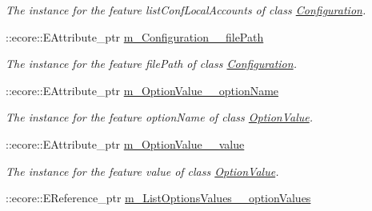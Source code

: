 \begin{DoxyCompactItemize}
\begin{DoxyCompactList}\small\item\em The instance for the feature listConfLocalAccounts of class \hyperlink{classUMS__Data_1_1Configuration}{Configuration}. \item\end{DoxyCompactList}\item 
\hypertarget{classUMS__Data_1_1UMS__DataPackage_a920d5cf0cef56c74876fea811f94db49}{
::ecore::EAttribute\_\-ptr \hyperlink{classUMS__Data_1_1UMS__DataPackage_a920d5cf0cef56c74876fea811f94db49}{m\_\-Configuration\_\-\_\-filePath}}
\label{classUMS__Data_1_1UMS__DataPackage_a920d5cf0cef56c74876fea811f94db49}

\begin{DoxyCompactList}\small\item\em The instance for the feature filePath of class \hyperlink{classUMS__Data_1_1Configuration}{Configuration}. \item\end{DoxyCompactList}\item 
\hypertarget{classUMS__Data_1_1UMS__DataPackage_a3a4c33668b970f193420bc685a4491d2}{
::ecore::EAttribute\_\-ptr \hyperlink{classUMS__Data_1_1UMS__DataPackage_a3a4c33668b970f193420bc685a4491d2}{m\_\-OptionValue\_\-\_\-optionName}}
\label{classUMS__Data_1_1UMS__DataPackage_a3a4c33668b970f193420bc685a4491d2}

\begin{DoxyCompactList}\small\item\em The instance for the feature optionName of class \hyperlink{classUMS__Data_1_1OptionValue}{OptionValue}. \item\end{DoxyCompactList}\item 
\hypertarget{classUMS__Data_1_1UMS__DataPackage_adf371e12d98bc5bd707cf7c759a95f87}{
::ecore::EAttribute\_\-ptr \hyperlink{classUMS__Data_1_1UMS__DataPackage_adf371e12d98bc5bd707cf7c759a95f87}{m\_\-OptionValue\_\-\_\-value}}
\label{classUMS__Data_1_1UMS__DataPackage_adf371e12d98bc5bd707cf7c759a95f87}

\begin{DoxyCompactList}\small\item\em The instance for the feature value of class \hyperlink{classUMS__Data_1_1OptionValue}{OptionValue}. \item\end{DoxyCompactList}\item 
\hypertarget{classUMS__Data_1_1UMS__DataPackage_adf21d8c0c0bd93b233f2594de61f068c}{
::ecore::EReference\_\-ptr \hyperlink{classUMS__Data_1_1UMS__DataPackage_adf21d8c0c0bd93b233f2594de61f068c}{m\_\-ListOptionsValues\_\-\_\-optionValues}}
\label{classUMS__Data_1_1UMS__DataPackage_adf21d8c0c0bd93b233f2594de61f068c}


\end{DoxyCompactItemize}
